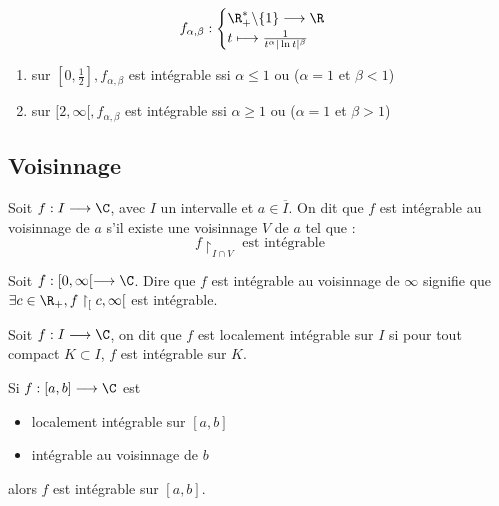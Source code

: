 \begin{example}
    \[ f_{\alpha, \beta} :
        \begin{cases}
            \R_+^* \backslash \{1\} \longrightarrow \R \\
            t \longmapsto \frac{1}{t^\alpha | \ln t |^\beta}
        \end{cases}
    \] 
    \begin{enumerate}
        \item sur $[0, \frac{1}{2}], f_{\alpha,\beta}$ est intégrable ssi $\alpha \le 1$ ou ($\alpha = 1$ et $ \beta < 1$)
        \item sur $[2, \infty[, f_{\alpha,\beta}$ est intégrable ssi $\alpha \ge 1$ ou ($\alpha = 1$ et $ \beta > 1$)
    \end{enumerate}
\end{example}
\newpage

\subsection{Voisinnage}

\begin{definition}
    Soit $f : I \longrightarrow \C$, avec $I$ un intervalle et $a \in \overline{I}$. On dit que $f$ est intégrable au voisinnage de $a$ s'il existe 
    une voisinnage $V$ de $a$ tel que :
        \[ f\restriction_{{I \cap V}} \text{ est intégrable} \] 
\end{definition}

\begin{example}
    Soit $f : [0, \infty[ \longrightarrow \C$. 
    Dire que $f$ est intégrable au voisinnage de $\infty$ signifie que $\exists c \in \R_+, f\restriction_[c, \infty[$ est intégrable.
\end{example}

\begin{definition}
    Soit $f : I \longrightarrow \C$, on dit que $f$ est localement intégrable sur $I$ si pour tout compact $K \subset I$, $f$ est intégrable sur $K$.
\end{definition}


\begin{remark}
    Si $f : [a,b] \longrightarrow \C$ est 
    \begin{itemize}
        \item localement intégrable sur $[a,b]$
        \item intégrable au voisinnage de $b$
    \end{itemize}
    alors $f$ est intégrable sur $[a,b]$.
\end{remark}

